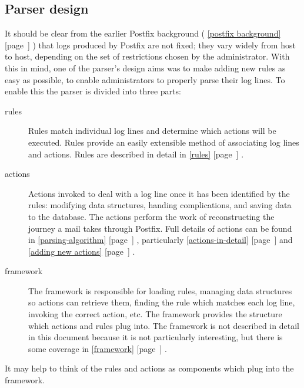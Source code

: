 \documentclass[a4paper,12pt,draft]{article}
\newcommand{\refwithpage}[1]{%
    \empty{}\ref{#1} [page~\pageref{#1}]%
}
\newcommand{\sectionref}[1]{%
    \textsection{}\refwithpage{#1}%
}
\begin{document}
\subsection{Parser design}

\label{parser design}

It should be clear from the earlier Postfix background (\sectionref{postfix
background}) that logs produced by Postfix are not fixed; they vary widely
from host to host, depending on the set of restrictions chosen by the
administrator.  With this in mind, one of the parser's design aims was to
make adding new rules as easy as possible, to enable administrators to
properly parse their log lines.  To enable this the parser is divided into
three parts:

\begin{description}

    \item [rules] Rules match individual log lines and determine which
        actions will be executed.  Rules provide an easily extensible
        method of associating log lines and actions.  Rules are described
        in detail in \sectionref{rules}.

    \item [actions] Actions invoked to deal with a log line once it has been
        identified by the rules: modifying data structures, handing
        complications, and saving data to the database.  The actions
        perform the work of reconstructing the journey a mail takes through
        Postfix.  Full details of actions can be found in
        \sectionref{parsing-algorithm}, particularly
        \sectionref{actions-in-detail} and \sectionref{adding new actions}.

    \item [framework] The framework is responsible for loading rules, managing data
        structures so actions can retrieve them, finding the rule which
        matches each log line, invoking the correct action, etc.  The
        framework provides the structure which actions and rules plug into.
        The framework is not described in detail in this document because
        it is not particularly interesting, but there is some coverage in
        \sectionref{framework}.

\end{description}

It may help to think of the rules and actions as components which plug into
the framework.  

\label{why separate rules, actions and framework?}
\end{document}
